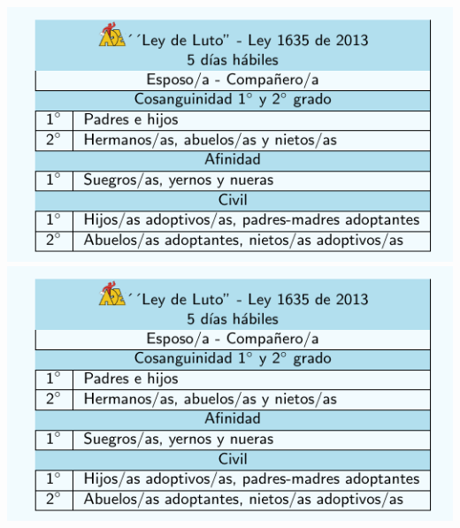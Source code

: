 \documentclass[10pt,letterpaper]{minimal}
\begin{document}
\begin{center}
\pagebreak
\hspace{1mm}\includegraphics[scale=1]{Tarjeta2.pdf} \includegraphics[scale=1]{Tarjeta2.pdf} \vspace{1mm}


\end{center}
\end{document}
